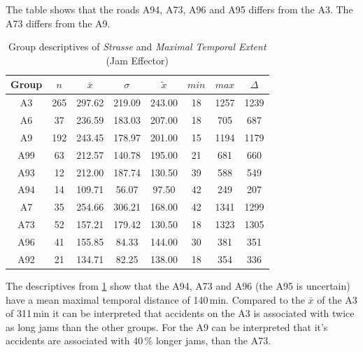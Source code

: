 The table shows that the roads A94, A73, A96 and A95 differs from the A3. The A73 differs from the A9.
\begin{table}[ht]
	\tiny
	\centering
	\begin{tabular}{c|c|c|c|c|c|c|c}
		\toprule
		Group & $n$ & $\bar{x}$ & $\sigma$ & $\tilde{x}$ & $min$ & $max$ & $\Delta$ \\
		\midrule
		A3   & 265 & 297.62 & 219.09 & 243.00 & 18 & 1257 & 1239 \\ 
		A6   & 37  & 236.59 & 183.03 & 207.00 & 18 & 705  & 687  \\ 
		A9   & 192 & 243.45 & 178.97 & 201.00 & 15 & 1194 & 1179 \\ 
		A99  & 63  & 212.57 & 140.78 & 195.00 & 21 & 681  & 660  \\ 
		A93  & 12  & 212.00 & 187.74 & 130.50 & 39 & 588  & 549  \\ 
		A94  & 14  & 109.71 & 56.07  & 97.50  & 42 & 249  & 207  \\ 
		A7   & 35  & 254.66 & 306.21 & 168.00 & 42 & 1341 & 1299 \\ 
		A73  & 52  & 157.21 & 179.42 & 130.50 & 18 & 1323 & 1305 \\ 
		A96  & 41  & 155.85 & 84.33  & 144.00 & 30 & 381  & 351  \\ 
		A92  & 21  & 134.71 & 82.25  & 138.00 & 18 & 354  & 336 \\ 
		\bottomrule
	  \end{tabular}
    \caption{Group descriptives of \textit{Strasse} and \textit{Maximal Temporal Extent} (Jam Effector)}
    \label{tbl:descriptives_baysis_effector_Strasse_TMax}
\end{table}
The descriptives from \cref{tbl:descriptives_baysis_effector_Strasse_TMax} show that the A94, A73 and A96 (the A95 is uncertain) have a mean maximal temporal distance of 140\,min. Compared to the $\bar{x}$ of the A3 of 311\,min it can be interpreted that accidents on the A3 is associated with twice as long jams than the other groups. For the A9 can be interpreted that it's accidents are associated with 40\,\% longer jams, than the A73.

